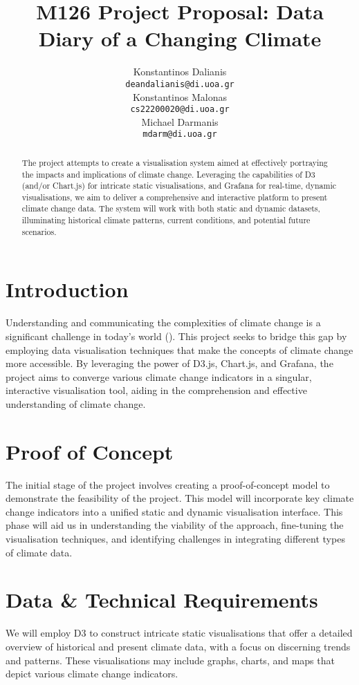 \documentclass{article} %
\title{M126 Project Proposal: Data Diary of a Changing Climate}
\author{
Konstantinos Dalianis \\
\texttt{deandalianis@di.uoa.gr} \\
\AND
Konstantinos Malonas \\
\texttt{cs22200020@di.uoa.gr} \\
\AND
Michael Darmanis \\
\texttt{mdarm@di.uoa.gr}
}
\begin{document}
\maketitle

\begin{abstract}
The project attempts to create a visualisation system aimed at effectively portraying the impacts and implications of climate change. Leveraging the capabilities of D3 (and/or Chart.js) for intricate static visualisations, and Grafana for real-time, dynamic visualisations, we aim to deliver a comprehensive and interactive platform to present climate change data. The system will work with both static and dynamic datasets, illuminating historical climate patterns, current conditions, and potential
future scenarios.
\end{abstract}

\section{Introduction}
Understanding and communicating the complexities of climate change is a significant challenge in today's world (\cite{skeptical, inside}). This project seeks to bridge this gap by employing data visualisation techniques that make the concepts of climate change more accessible. By leveraging the power of D3.js, Chart.js, and Grafana, the project aims to converge various climate change indicators in a singular, interactive visualisation tool, aiding in the comprehension and effective understanding of climate change. 

\section{Proof of Concept}
The initial stage of the project involves creating a proof-of-concept model to demonstrate the feasibility of the project. This model will incorporate key climate change indicators into a unified static and dynamic visualisation interface. This phase will aid us in understanding the viability of the approach, fine-tuning the visualisation techniques, and identifying challenges in integrating different types of climate data.

\section{Data \& Technical Requirements}
We will employ D3 to construct intricate static visualisations that offer a detailed overview of historical and present climate data, with a focus on discerning trends and patterns. These visualisations may include graphs, charts, and maps that depict various climate change indicators.
\end{document}
